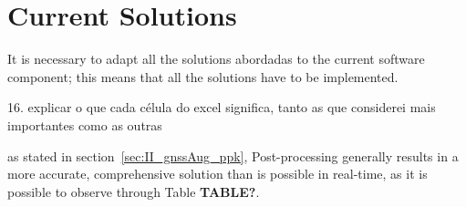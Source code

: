 %









\section{Current Solutions}\label{sec:II_curr_solutions}
It is necessary to adapt all the solutions abordadas to the current software component; this means that all the solutions have to be implemented.

16. explicar o que cada célula do excel significa, tanto as que considerei mais importantes como as outras

as stated in section~\ref{sec:II_gnssAug_ppk}, Post-processing generally results in a more accurate, comprehensive solution than is possible in real-time, as it is possible to observe through Table \textbf{TABLE?}.
